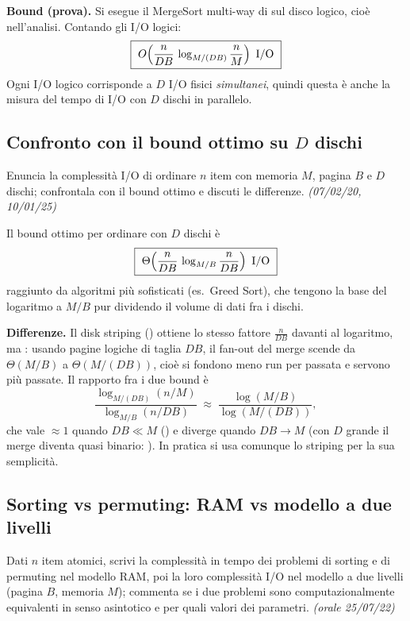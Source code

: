 \textbf{Bound (prova).} Si esegue il MergeSort multi-way di  sul disco logico, cio\`e
 nell'analisi. Contando gli I/O logici:
\[
\boxed{\ \OO{\frac{n}{DB}\,\log_{M/(DB)}\frac{n}{M}} \text{ I/O}\ }
\]
Ogni I/O logico corrisponde a $D$ I/O fisici \emph{simultanei}, quindi questa \`e anche la misura
del tempo di I/O con $D$ dischi in parallelo.

\subsection*{ Confronto con il bound ottimo su $D$ dischi}

\begin{domanda}
Enuncia la complessit\`a I/O di ordinare $n$ item con memoria $M$, pagina $B$ e $D$ dischi;
confrontala con il bound ottimo e discuti le differenze. \emph{(07/02/20, 10/01/25)}
\end{domanda}

Il bound ottimo per ordinare con $D$ dischi \`e
\[
\boxed{\ \TT{\frac{n}{DB}\,\log_{M/B}\frac{n}{DB}}\ \text{I/O}\ }
\]
raggiunto da algoritmi pi\`u sofisticati (es.\ Greed Sort), che tengono la base del logaritmo a
$M/B$ pur dividendo il volume di dati fra i dischi.

\textbf{Differenze.} Il disk striping () ottiene lo stesso fattore $\frac{n}{DB}$ davanti
al logaritmo, ma : usando pagine logiche di
taglia $DB$, il fan-out del merge scende da $\Theta(M/B)$ a $\Theta(M/(DB))$, cio\`e si fondono
meno run per passata e servono pi\`u passate. Il rapporto fra i due bound \`e
\[
\frac{\log_{M/(DB)}(n/M)}{\log_{M/B}(n/DB)}\;\approx\;\frac{\log(M/B)}{\log(M/(DB))},
\]
che vale $\approx 1$ quando $DB\ll M$ () e diverge quando
$DB\to M$ (con $D$ grande il merge diventa quasi binario: ). In pratica si usa comunque lo striping per la sua semplicit\`a.

\subsection*{ Sorting vs permuting: RAM vs modello a due livelli}

\begin{domanda}
Dati $n$ item atomici, scrivi la complessit\`a in tempo dei problemi di sorting e di permuting nel
modello RAM, poi la loro complessit\`a I/O nel modello a due livelli (pagina $B$, memoria $M$);
commenta se i due problemi sono computazionalmente equivalenti in senso asintotico e per quali
valori dei parametri. \emph{(orale 25/07/22)}
\end{domanda}

